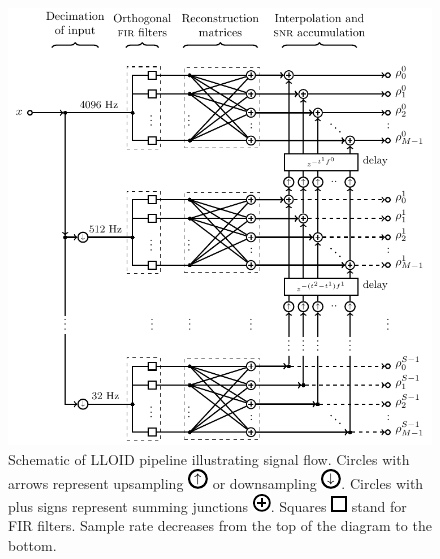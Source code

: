 \begin{figure}[htbp]
	\includegraphics{figures/lloid-diagram.pdf}
	\caption{Schematic of LLOID pipeline illustrating signal flow.  Circles with arrows represent upsampling \protect\includegraphics{figures/upsample-symbol.pdf} or downsampling \protect\includegraphics{figures/downsample-symbol.pdf}.  Circles with plus signs represent summing junctions \protect\includegraphics{figures/adder-symbol.pdf}.  Squares \protect\includegraphics{figures/fir-symbol.pdf} stand for FIR filters.  Sample rate decreases from the top of the diagram to the bottom.}
\end{figure}
